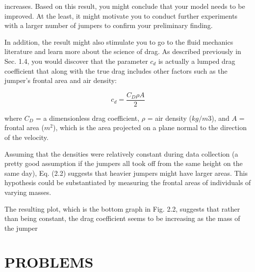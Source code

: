 \documentclass[../main.tex]{subfiles}
\begin{document}
increases. Based on this result, you might conclude that your model needs to be improved.
At the least, it might motivate you to conduct further experiments with a larger number of
jumpers to confirm your preliminary finding.


In addition, the result might also stimulate you to go to the fluid mechanics literature and
learn more about the science of drag. As described previously in Sec. 1.4, you would discover that the parameter 
$c_d$ is actually a 
lumped drag coefficient that along with the true
drag includes other factors such as the jumper's frontal area and air density:

\begin{equation}
	\tag{2.2}
	c_d=\dfrac{C_D \rho A}{2}
\end{equation}

where $C_D$ = a dimensionless drag coefficient, $\rho$ = air density ($kg/m3$), and $A$ = frontal
area ($m^2$), which is the area projected on a plane normal to the direction of the velocity.


Assuming that the densities were relatively constant during data collection (a pretty
good assumption if the jumpers all took off from the same height on the same day), Eq. (2.2)
suggests that heavier jumpers might have larger areas. This hypothesis could be substantiated by measuring the frontal
 areas of individuals of varying masses.


The resulting plot, which is the bottom graph in Fig. 2.2, suggests that rather than
being constant, the drag coefficient seems to be increasing as the mass of the jumper

\bigskip
\section*{PROBLEMS}
\end{document}
